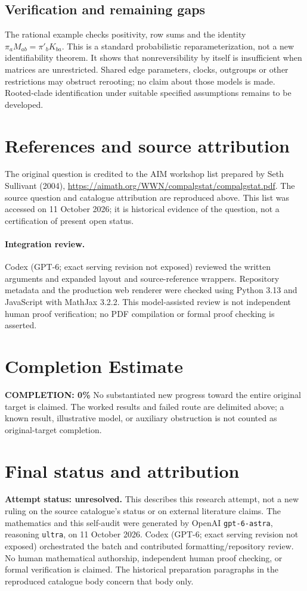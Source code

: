 \documentclass[11pt]{article}
\begin{document}
\subsection{Verification and remaining gaps}
The rational example checks positivity, row sums and the identity $\pi_aM_{ab}=\pi'_bK_{ba}$. This is a standard probabilistic reparameterization, not a new identifiability theorem. It shows that nonreversibility by itself is insufficient when matrices are unrestricted. Shared edge parameters, clocks, outgroups or other restrictions may obstruct rerooting; no claim about those models is made. Rooted-clade identification under suitable specified assumptions remains to be developed.

\section{References and source attribution}
The original question is credited to the AIM workshop list prepared by Seth Sullivant (2004), \url{https://aimath.org/WWN/compalgstat/compalgstat.pdf}. The source question and catalogue attribution are reproduced above. This list was accessed on 11 October 2026; it is historical evidence of the question, not a certification of present open status.


\paragraph{Integration review.} Codex (GPT-6; exact serving revision not exposed) reviewed the written arguments and expanded layout and source-reference wrappers. Repository metadata and the production web renderer were checked using Python 3.13 and JavaScript with MathJax 3.2.2. This model-assisted review is not independent human proof verification; no PDF compilation or formal proof checking is asserted.

\section{Completion Estimate}
\noindent\textbf{COMPLETION: 0\%}
No substantiated new progress toward the entire original target is claimed. The worked results and failed route are delimited above; a known result, illustrative model, or auxiliary obstruction is not counted as original-target completion.

\section{Final status and attribution}
\textbf{Attempt status: unresolved.} This describes this research attempt, not a new ruling on the source catalogue's status or on external literature claims.
The mathematics and this self-audit were generated by OpenAI \texttt{gpt-6-astra}, reasoning \texttt{ultra}, on 11 October 2026. Codex (GPT-6; exact serving revision not exposed) orchestrated the batch and contributed formatting/repository review. No human mathematical authorship, independent human proof checking, or formal verification is claimed. The historical preparation paragraphs in the reproduced catalogue body concern that body only.
\end{document}
